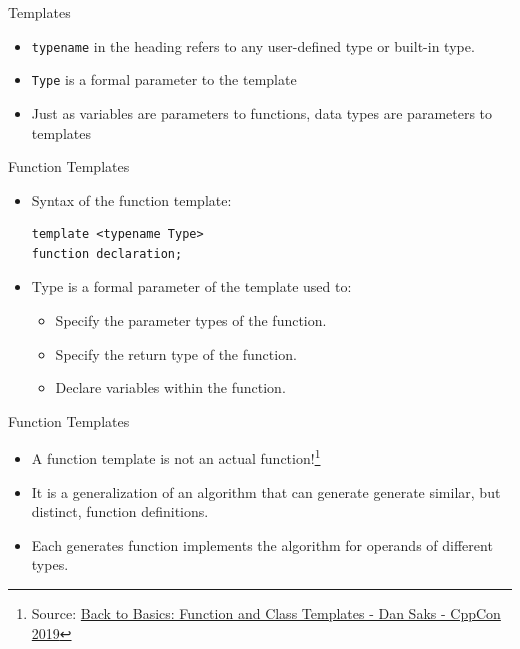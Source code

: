 \documentclass[14pt,aspectratio=1610, hyperref={pdfpagelayout=SinglePage}]{beamer}
\begin{document}
\begin{frame}[fragile]{Templates}
\protect\hypertarget{templates-2-of-2}{}
\begin{itemize}
\item
  \lstinline{typename} in the heading refers to any user-defined type or
  built-in type.
\item
  \lstinline{Type} is a formal parameter to the template
\item
  Just as variables are parameters to functions, data types are
  parameters to templates
\end{itemize}
\end{frame}

\begin{frame}[fragile]{Function Templates}
\protect\hypertarget{function-templates}{}
\begin{itemize}
\item
  Syntax of the function template:
\begin{lstlisting}
template <typename Type>
function declaration;
\end{lstlisting}
\item
  Type is a formal parameter of the template used to:
  \begin{itemize}
  \item
    Specify the parameter types of the function.
  \item
    Specify the return type of the function.
  \item
    Declare variables within the function.
  \end{itemize}
\end{itemize}
\end{frame}

\begin{frame}{Function Templates}
\begin{itemize}
\item
  {\large{A function template is not an actual function!}}\footnote[frame]{\tiny Source: \href{https://youtu.be/LMP_sxOaz6g}{Back to Basics: Function and Class Templates - Dan Saks - CppCon 2019}}
\item
  It is a generalization of an algorithm that can generate generate similar, but distinct, function definitions.
\item
  Each generates function implements the algorithm for operands of different types.
\end{itemize}
\end{frame}

\end{document}
